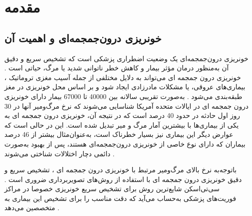 \chapter{مقدمه}

\section{ خونریزی درون‌جمجمه‌ای و اهمیت آن}

خونریزی‌ درون‌جمجمه‌ای
یک وضعیت اضطراری پزشکی است که تشخیص سریع و دقیق آن به‌منظور درمان مؤثر بیمار و کاهش خطر ناتوانی شدید یا مرگ، حیاتی است \cite{grewal2018radnet}.
خونریزی درون جمجمه ای
می‌تواند به دلایل مختلفی از جمله آسیب مغزی تروماتیک
، بیماری‌های عروقی، یا مشکلات مادرزادی ایجاد شود و بر اساس محل خونریزی در مغز طبقه‌بندی می‌شود \cite{monica2022detection}.
 به‌صورت تقریبی سالانه بین 40000 تا 67000 بیمار دارای
خونریزی درون جمجمه ای
   در ایالات متحده آمریکا شناسایی می‌شوند که نرخ مرگ‌ومیر آنها در 30 روز اول حادثه در حدود 40 درصد است که در نتیجه آن، 
خونریزی درون جمجمه ای
   به یکی از بیماری‌ها با بیشترین آمار مرگ و میر تبدیل شده است. این در حالی است که عوارض دیگر این بیماری نیز بسیار خطرناک است، به‌عنوان‌مثال بیشتر از 46 درصد بیماران که دارای نوع خاصی از خونریزی درون‌جمجمه‌ای هستند، پس از بهبود به‌صورت دائمی دچار اختلالات شناختی می‌شوند
 \cite{arbabshirani2018advanced,burduja2020accurate,morgenstern2010guidelines,van2010incidence,hackett2000health}.

  باتوجه‌به نرخ بالای مرگ‌ومیر مرتبط با 
  خونریزی درون جمجمه ای
  ، تشخیص سریع و دقیق 
  خونریزی درون جمجمه ای
  با استفاده از روش‌های تصویربرداری ضروری است \cite{kuo2019expert}. سی‌تی‌اسکن
   شایع‌ترین روش برای تشخیص سریع خونریزی خصوصا در مراکز فوریت‌های پزشکی به‌حساب می‌آید که دقت مناسب را برای تشخیص این بیماری به متخصصین می‌دهد \cite{ye2019precise,grewal2018radnet,arbabshirani2018advanced,chilamkurthy2018deep}.


